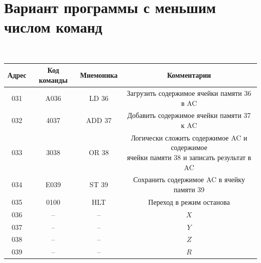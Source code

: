 \documentclass[11pt,a4paper]{article}
\begin{document}
\section{Вариант программы с меньшим числом команд}
\begin{table}[H]
	{\tt
		\begin{tabular}{|c|c|c|c|}
			\hline
			\textbf{Адрес} & \textbf{Код команды} & \textbf{Мнемоника} &           \textbf{Комментарии}            \\ \hline
			031 & A036 & LD 36 & Загрузить содержимое ячейки памяти 36 в AC\\ \hline
			032 & 4037 & ADD 37 & Добавить содержимое ячейки памяти 37 к AC\\ \hline
			033 & 3038 & OR 38 & \makecell{Логически сложить содержимое AC и содержимое\\ ячейки памяти 38 и записать результат в AC}\\ \hline
			034 & E039 & ST 39 & Сохранить содержимое AC в ячейку памяти 39\\ \hline
			035 & 0100 & HLT & Переход в режим останова\\ \hline
			036 & -- & -- & $X$\\ \hline
			037 & -- & -- & $Y$\\ \hline
			038 & -- & -- & $Z$\\ \hline
			039 & -- & -- & $R$\\ \hline
		\end{tabular}
	}
\end{table}
\end{document}
